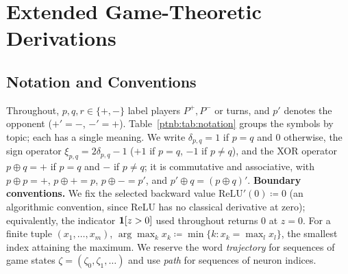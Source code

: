\chapter{Extended Game-Theoretic Derivations}\label{app:supp_games}

\section{Notation and Conventions}\label{ptnb:app:notation}\label{ptnb:app:notation-identities}

Throughout, $p, q, r \in \{+, -\}$ label players $P^+,P^-$ or turns, and $p'$ denotes the opponent
($+' = -$, $-' = +$). Table~\ref{ptnb:tab:notation} groups the symbols by topic; each has a single meaning. We write $\delta_{p,q} = 1$ if $p=q$ and $0$
otherwise, the sign operator $\xi_{p,q} = 2\delta_{p,q} - 1$ ($+1$ if $p=q$, $-1$ if $p \neq q$),
and the XOR operator $p \oplus q = +$ if $p=q$ and $-$ if $p \neq q$; it is commutative and
associative, with $p \oplus p = +$, $p \oplus + = p$, $p \oplus - = p'$, and $p' \oplus q = (p
    \oplus q)'$.
\textbf{Boundary conventions.} We fix the selected backward value $\mathrm{ReLU}'(0)\coloneqq0$ (an algorithmic convention, since ReLU has no classical derivative at zero); equivalently, the indicator
$\mathbf{1}[z > 0]$ used throughout returns $0$ at $z = 0$. For a finite tuple $(x_1, \dots, x_m)$,
$\arg\max_k x_k \coloneqq \min\{k : x_k = \max_l x_l\}$, the smallest index attaining the maximum.
We reserve the word \emph{trajectory} for sequences of game states $\zeta = (\zeta_0, \zeta_1,
    \dots)$ and use \emph{path} for sequences of neuron indices.

